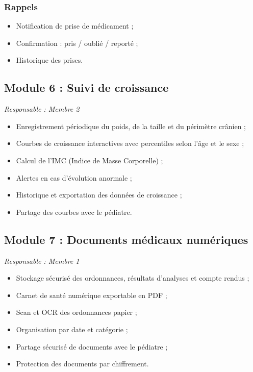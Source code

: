 \documentclass[11pt,a4paper]{article}
\begin{document}
\subsubsection{Rappels}
\begin{itemize}
  \item Notification de prise de médicament ;
  \item Confirmation : pris / oublié / reporté ;
  \item Historique des prises.
\end{itemize}

\subsection{Module 6 : Suivi de croissance}

\textit{Responsable : Membre 2}

\begin{itemize}
  \item Enregistrement périodique du poids, de la taille et du périmètre crânien ;
  \item Courbes de croissance interactives avec percentiles selon l'âge et le sexe ;
  \item Calcul de l'IMC (Indice de Masse Corporelle) ;
  \item Alertes en cas d'évolution anormale ;
  \item Historique et exportation des données de croissance ;
  \item Partage des courbes avec le pédiatre.
\end{itemize}

\subsection{Module 7 : Documents médicaux numériques}

\textit{Responsable : Membre 1}

\begin{itemize}
  \item Stockage sécurisé des ordonnances, résultats d'analyses et compte rendus ;
  \item Carnet de santé numérique exportable en PDF ;
  \item Scan et OCR des ordonnances papier ;
  \item Organisation par date et catégorie ;
  \item Partage sécurisé de documents avec le pédiatre ;
  \item Protection des documents par chiffrement.
\end{itemize}
\end{document}
